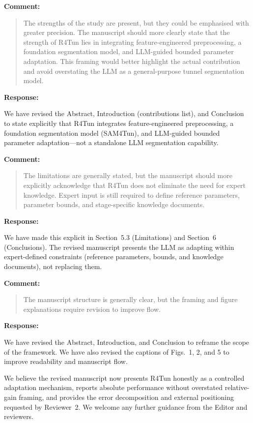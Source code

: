 \documentclass[11pt,a4paper]{article}
\newenvironment{commentblock}{%
  \par\smallskip\noindent\textbf{Comment:}\par
  \begin{quote}\itshape\color{black}
}{%
  \end{quote}\smallskip
}
\newenvironment{responseblock}{%
  \par\smallskip\noindent\textbf{Response:}\par
  \begingroup\color{responsegreen}
}{%
  \endgroup\smallskip
}
\begin{document}
\begin{commentblock}
The strengths of the study are present, but they could be emphasised with greater precision. The manuscript should more clearly state that the strength of R4Tun lies in integrating feature-engineered preprocessing, a foundation segmentation model, and LLM-guided bounded parameter adaptation. This framing would better highlight the actual contribution and avoid overstating the LLM as a general-purpose tunnel segmentation model.
\end{commentblock}
\begin{responseblock}
We have revised the Abstract, Introduction (contributions list), and Conclusion to state explicitly that R4Tun integrates feature-engineered preprocessing, a foundation segmentation model (SAM4Tun), and LLM-guided bounded parameter adaptation---not a standalone LLM segmentation capability.
\end{responseblock}

\begin{commentblock}
The limitations are generally stated, but the manuscript should more explicitly acknowledge that R4Tun does not eliminate the need for expert knowledge. Expert input is still required to define reference parameters, parameter bounds, and stage-specific knowledge documents.
\end{commentblock}
\begin{responseblock}
We have made this explicit in Section~5.3 (Limitations) and Section~6 (Conclusions). The revised manuscript presents the LLM as adapting within expert-defined constraints (reference parameters, bounds, and knowledge documents), not replacing them.
\end{responseblock}

\begin{commentblock}
The manuscript structure is generally clear, but the framing and figure explanations require revision to improve flow.
\end{commentblock}
\begin{responseblock}
We have revised the Abstract, Introduction, and Conclusion to reframe the scope of the framework. We have also revised the captions of Figs.~1, 2, and 5 to improve readability and manuscript flow.
\end{responseblock}

\bigskip
\noindent We believe the revised manuscript now presents R4Tun honestly as a controlled adaptation mechanism, reports absolute performance without overstated relative-gain framing, and provides the error decomposition and external positioning requested by Reviewer~2. We welcome any further guidance from the Editor and reviewers.
\end{document}
